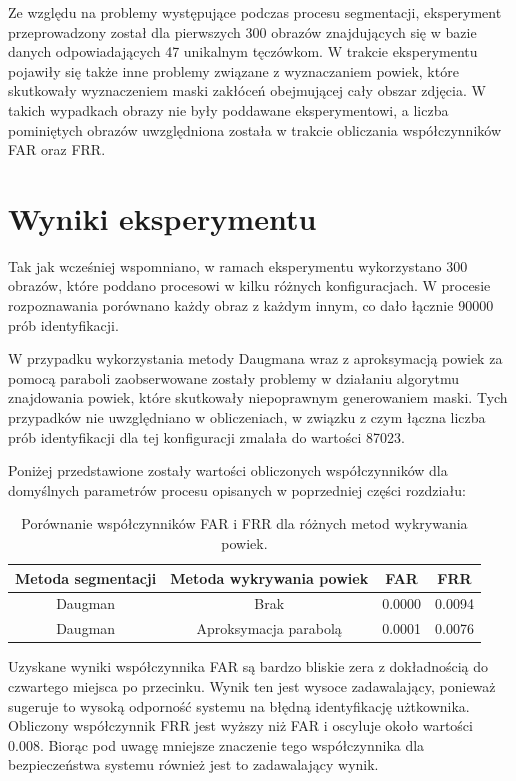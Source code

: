 Ze względu na problemy występujące podczas procesu segmentacji, eksperyment przeprowadzony został dla pierwszych
300 obrazów znajdujących się w bazie danych odpowiadających 47 unikalnym tęczówkom. W trakcie eksperymentu
pojawiły się także inne problemy związane z wyznaczaniem powiek, które skutkowały wyznaczeniem maski zakłóceń
obejmującej cały obszar zdjęcia. W takich wypadkach obrazy nie były poddawane eksperymentowi, a liczba pominiętych
obrazów uwzględniona została w trakcie obliczania współczynników FAR oraz FRR.

\section{Wyniki eksperymentu}

Tak jak wcześniej wspomniano, w ramach eksperymentu wykorzystano 300 obrazów, które poddano procesowi
w kilku różnych konfiguracjach. W procesie rozpoznawania porównano każdy obraz z każdym innym, co dało
łącznie 90000 prób identyfikacji.

W przypadku wykorzystania metody Daugmana wraz z aproksymacją powiek za pomocą paraboli zaobserwowane
zostały problemy w działaniu algorytmu znajdowania powiek, które skutkowały niepoprawnym generowaniem maski.
Tych przypadków nie uwzględniano w obliczeniach, w związku z czym łączna liczba prób identyfikacji dla tej
konfiguracji zmalała do wartości 87023.\newline

\noindent
Poniżej przedstawione zostały wartości obliczonych współczynników dla domyślnych parametrów
procesu opisanych w poprzedniej części rozdziału:

\begin{table}[ht]
  \centering
  \begin{tabular}{c|c|c|c}
    \rowcolor{gray!20}
    Metoda segmentacji & Metoda wykrywania powiek & FAR & FRR \\
    \hline\hline
    Daugman & Brak & 0.0000 & 0.0094 \\
    \hline
    Daugman & Aproksymacja parabolą & 0.0001 & 0.0076 \\
  \end{tabular}
  \caption{Porównanie współczynników FAR i FRR dla różnych metod wykrywania powiek.}
\end{table}

Uzyskane wyniki współczynnika FAR są bardzo bliskie zera z dokładnością do czwartego miejsca
po przecinku. Wynik ten jest wysoce zadawalający, ponieważ sugeruje to wysoką odpornoś\'c systemu
na błędną identyfikację użtkownika. Obliczony współczynnik FRR jest wyższy niż FAR i oscyluje
około wartości 0.008. Biorąc pod uwagę mniejsze znaczenie tego współczynnika dla bezpieczeństwa
systemu również jest to zadawalający wynik.\newline

